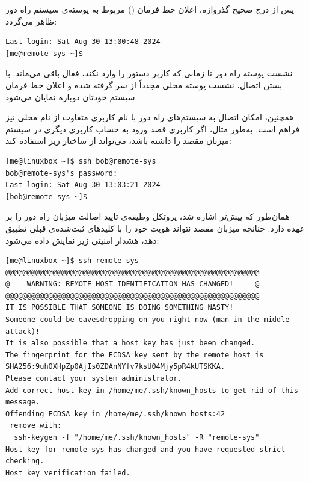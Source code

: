 پس از درج صحیح گذرواژه، اعلان خط فرمان () مربوط به پوسته‌ی سیستم راه دور ظاهر می‌گردد:

\begin{latin}
\begin{lstlisting}
Last login: Sat Aug 30 13:00:48 2024
[me@remote-sys ~]$
\end{lstlisting}
\end{latin}

نشست پوسته راه دور تا زمانی که کاربر دستور  را وارد نکند، فعال باقی می‌ماند. با بستن اتصال، نشست پوسته محلی مجدداً از سر گرفته شده و اعلان خط فرمان سیستم خودتان دوباره نمایان می‌شود.

همچنین، امکان اتصال به سیستم‌های راه دور با نام کاربری متفاوت از نام محلی نیز فراهم است. به‌طور مثال، اگر کاربری قصد ورود به حساب کاربری دیگری در سیستم میزبان مقصد را داشته باشد، می‌تواند از ساختار زیر استفاده کند:

\begin{latin}
\begin{lstlisting}
[me@linuxbox ~]$ ssh bob@remote-sys
bob@remote-sys's password:
Last login: Sat Aug 30 13:03:21 2024
[bob@remote-sys ~]$
\end{lstlisting}
\end{latin}

همان‌طور که پیش‌تر اشاره شد، پروتکل  وظیفه‌ی تأیید اصالت میزبان راه دور را بر عهده دارد. چنانچه میزبان مقصد نتواند هویت خود را با کلیدهای ثبت‌شده‌ی قبلی تطبیق دهد، هشدار امنیتی زیر نمایش داده می‌شود:

\begin{latin}
\begin{lstlisting}
[me@linuxbox ~]$ ssh remote-sys
@@@@@@@@@@@@@@@@@@@@@@@@@@@@@@@@@@@@@@@@@@@@@@@@@@@@@@@@@@@
@    WARNING: REMOTE HOST IDENTIFICATION HAS CHANGED!     @
@@@@@@@@@@@@@@@@@@@@@@@@@@@@@@@@@@@@@@@@@@@@@@@@@@@@@@@@@@@
IT IS POSSIBLE THAT SOMEONE IS DOING SOMETHING NASTY!
Someone could be eavesdropping on you right now (man-in-the-middle attack)!
It is also possible that a host key has just been changed.
The fingerprint for the ECDSA key sent by the remote host is
SHA256:9uhOXHpZp0AjIs0ZDAnNYfv7ksU04Mjy5pR4kUTSKKA.
Please contact your system administrator.
Add correct host key in /home/me/.ssh/known_hosts to get rid of this message.
Offending ECDSA key in /home/me/.ssh/known_hosts:42
 remove with:
  ssh-keygen -f "/home/me/.ssh/known_hosts" -R "remote-sys"
Host key for remote-sys has changed and you have requested strict checking.
Host key verification failed.
\end{lstlisting}
\end{latin}

